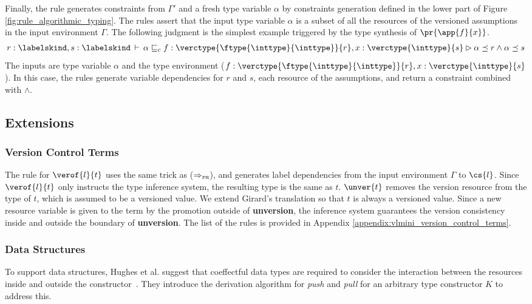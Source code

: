 Finally, the rule generates constraints from $\Gamma'$ and a fresh type variable $\alpha$ by constraints generation defined in the lower part of Figure \ref{fig:rule_algorithmic_typing}.
The rules assert that the input type variable $\alpha$ is a subset of all the resources of the versioned assumptions in the input environment $\Gamma$. The following judgment is the simplest example triggered by the type synthesis of $\pr{\app{f}{x}}$.
\begin{align*}
r:\labelskind,s:\labelskind \,\vdash\, \alpha \sqsubseteq_{c} f:\verctype{\ftype{\inttype}{\inttype}}{r}, x:\verctype{\inttype}{s} \rhd \alpha \preceq r \land \alpha \preceq s
\end{align*}
The inputs are type variable $\alpha$ and the type environment ($f:\verctype{\ftype{\inttype}{\inttype}}{r}, x:\verctype{\inttype}{s}$). In this case, the rules generate variable dependencies for $r$ and $s$, each resource of the assumptions, and return a constraint combined with $\land$.

\subsection{Extensions}
\subsubsection{Version Control Terms}
The rule for $\verof{l}{t}$ uses the same trick as ($\Rightarrow_\textsc{pr}$), and generates label dependencies from the input environment $\Gamma$ to $\cs{l}$. Since $\verof{l}{t}$ only instructs the type inference system, the resulting type is the same as $t$.
$\unver{t}$ removes the version resource from the type of $t$, which is assumed to be a versioned value. We extend Girard's translation so that $t$ is always a versioned value.
Since a new resource variable is given to the term by the promotion outside of \textbf{unversion}, the inference system guarantees the version consistency inside and outside the boundary of \textbf{unversion}.
The list of the rules is provided in Appendix \ref{appendix:vlmini_version_control_terms}.


\subsubsection{Data Structures}
To support data structures, Hughes et al. suggest that coeffectful data types are required to consider the interaction between the resources inside and outside the constructor~\cite{EPTCS353.6}. They introduce the derivation algorithm for \emph{push} and \emph{pull} for an arbitrary type constructor $K$ to address this.

